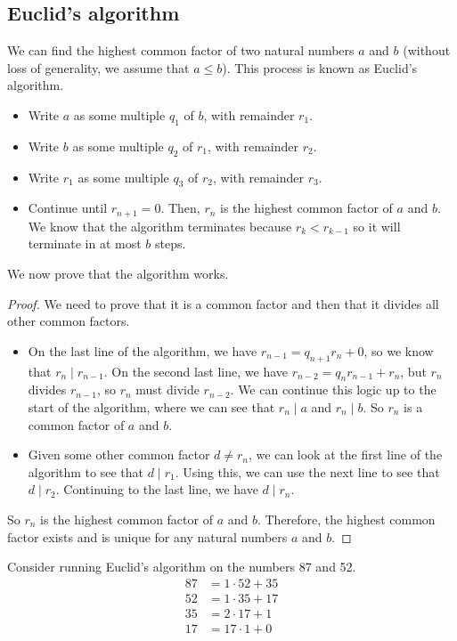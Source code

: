 \subsection{Euclid's algorithm}
We can find the highest common factor of two natural numbers \(a\) and \(b\) (without loss of generality, we assume that \(a \leq b\)).
This process is known as Euclid's algorithm.
\begin{itemize}
	\item Write \(a\) as some multiple \(q_1\) of \(b\), with remainder \(r_1\).
	\item Write \(b\) as some multiple \(q_2\) of \(r_1\), with remainder \(r_2\).
	\item Write \(r_1\) as some multiple \(q_3\) of \(r_2\), with remainder \(r_3\).
	\item Continue until \(r_{n+1}=0\).
	      Then, \(r_n\) is the highest common factor of \(a\) and \(b\).
	      We know that the algorithm terminates because \(r_k < r_{k-1}\) so it will terminate in at most \(b\) steps.
\end{itemize}
We now prove that the algorithm works.
\begin{proof}
	We need to prove that it is a common factor and then that it divides all other common factors.
	\begin{itemize}
		\item On the last line of the algorithm, we have \(r_{n-1} = q_{n+1} r_n + 0\), so we know that \(r_n \mid r_{n-1}\).
		      On the second last line, we have \(r_{n-2} = q_n r_{n-1} + r_n\), but \(r_n\) divides \(r_{n-1}\), so \(r_n\) must divide \(r_{n-2}\).
		      We can continue this logic up to the start of the algorithm, where we can see that \(r_n \mid a\) and \(r_n \mid b\).
		      So \(r_n\) is a common factor of \(a\) and \(b\).
		\item Given some other common factor \(d \neq r_n\), we can look at the first line of the algorithm to see that \(d \mid r_1\).
		      Using this, we can use the next line to see that \(d \mid r_2\).
		      Continuing to the last line, we have \(d \mid r_n\).
	\end{itemize}
	So \(r_n\) is the highest common factor of \(a\) and \(b\).
	Therefore, the highest common factor exists and is unique for any natural numbers \(a\) and \(b\).
\end{proof}
Consider running Euclid's algorithm on the numbers 87 and 52.
\begin{align*}
	87 & = 1 \cdot 52 + 35 \\
	52 & = 1 \cdot 35 + 17 \\
	35 & = 2 \cdot 17 + 1  \\
	17 & = 17 \cdot 1 + 0
\end{align*}
